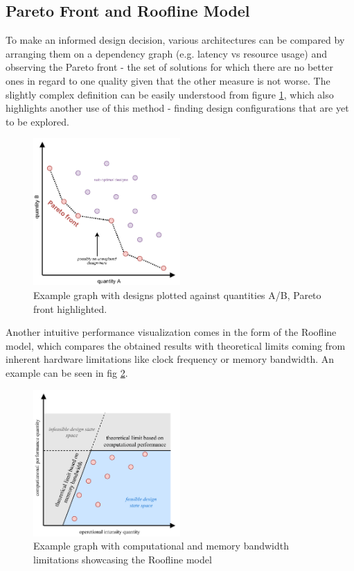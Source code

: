 \pagebreak
\subsection{Pareto Front and Roofline Model}
To make an informed design decision, various architectures can be compared by arranging them on a dependency graph (e.g. latency vs resource usage) and observing the Pareto front - the set of solutions for which there are no better ones in regard to one quality given that the other measure is not worse. The slightly complex definition can be easily understood from figure \ref{fig:pareto}, which also highlights another use of this method - finding design configurations that are yet to be explored.

\begin{figure}[hpt!]
  \centering
  \includegraphics[trim={0cm 0cm 0cm 0cm}, width=0.5\textwidth, center]{background/pareto.pdf}
  \caption{Example graph with designs plotted against quantities A/B, Pareto front highlighted.}
  \label{fig:pareto}
\end{figure}

\pagebreak
Another intuitive performance visualization comes in the form of the Roofline model, which compares the obtained results with theoretical limits coming from inherent hardware limitations like clock frequency or memory bandwidth. An example can be seen in fig \ref{fig:roofline}.

\begin{figure}[hpt!]
  \centering
  \includegraphics[trim={0cm 0cm 0cm 0cm}, width=0.5\textwidth, center]{background/roofline.pdf}
  \caption{Example graph with computational and memory bandwidth limitations showcasing the Roofline model}
  \label{fig:roofline}
\end{figure}